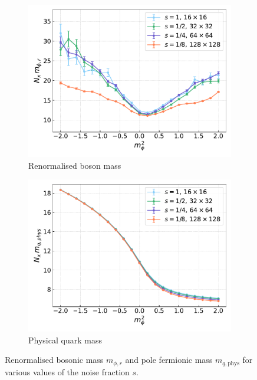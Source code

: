 \begin{figure}[h!]
    \begin{subfigure}{0.47\textwidth}
        \includegraphics[width=\textwidth]{figures/cooling/mass_scan/mphir.pdf}
        \caption{Renormalised boson mass}
    \end{subfigure}
    \hfill 
    \begin{subfigure}{0.47\textwidth}
        \includegraphics[width=\textwidth]{figures/cooling/mass_scan/mqphys.pdf}
        \caption{Physical quark mass}
    \end{subfigure}
    \caption[More observables in the cooling procedure as a function of the scalar mass squared]{Renormalised bosonic mass $m_{\phi, r}$ and pole fermionic mass $m_{q,\text{phys}}$ for various values of the noise fraction $s$.}
    \label{fig:cooling_masses}
\end{figure}
